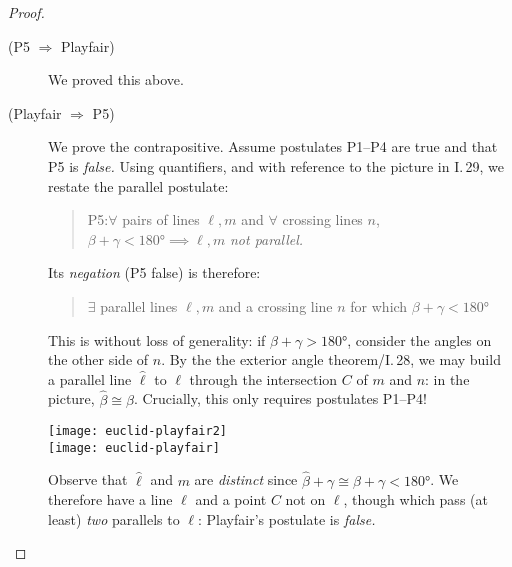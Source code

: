 \begin{proof}
	\begin{description}
		\item[\normalfont (P5 $\Rightarrow$ Playfair)] We proved this above.
		\item[\normalfont (Playfair $\Rightarrow$ P5)] We prove the contrapositive. Assume postulates P1--P4 are true and that P5 is \emph{false.} Using quantifiers, and with reference to the picture in I.\,29, we restate the parallel postulate:
	\begin{quote}
	  P5:\lstsp $\forall$ pairs of lines $\ell,m$ and $\forall$ crossing lines $n$, \  $\beta+\gamma<\ang{180}\implies\ell,m$ \emph{not parallel.}
	\end{quote}
	\begin{minipage}[t]{0.62\linewidth}\vspace{-7pt}
		Its \emph{negation} (P5 false) is therefore:
		\begin{quote}
	  	$\exists$ parallel lines $\ell,m$ and a crossing line $n$ for which $\beta+\gamma<\ang{180}$
		\end{quote}
		This is without loss of generality: if $\beta+\gamma>\ang{180}$, consider the angles on the other side of $n$.\medbreak
		By the the exterior angle theorem/I.\,28, we may build a parallel line $\hat\ell$ to $\ell$ through the intersection $C$ of $m$ and $n$: in the picture, $\hat\beta\cong\beta$. Crucially, this only requires postulates P1--P4!
	\end{minipage}
	\hfill
	\begin{minipage}[t]{0.37\linewidth}\vspace{0pt}
		\flushright
		\texttt{[image: euclid-playfair2]}\\
		\texttt{[image: euclid-playfair]}
	\end{minipage}\smallbreak
	Observe that $\hat\ell$ and $m$ are \emph{distinct} since $\hat\beta+\gamma\cong\beta+\gamma<\ang{180}$.
	We therefore have a line $\ell$ and a point $C$ not on $\ell$, though which pass (at least) \emph{two} parallels to $\ell$: Playfair's postulate is \emph{false.} \qedhere
	\end{description}
\end{proof}



\label{pg:sphere}

